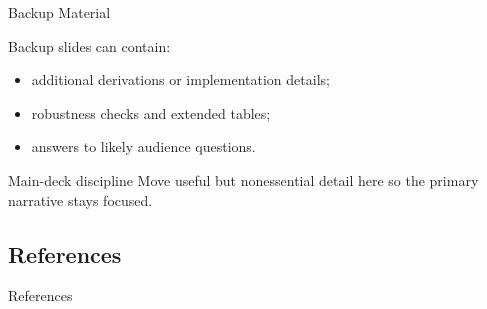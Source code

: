 \documentclass[10pt,aspectratio=169]{virgiling-slides}
\begin{document}
\begin{frame}{Backup Material}
  \hypertarget{backup-demo}{}

  Backup slides can contain:
  \begin{itemize}
    \item additional derivations or implementation details;
    \item robustness checks and extended tables;
    \item answers to likely audience questions.
  \end{itemize}

  \begin{block}{Main-deck discipline}
    Move useful but nonessential detail here so the primary narrative stays focused.
  \end{block}

  \begin{center}
    \hyperlink{navigation-demo}{}
  \end{center}
\end{frame}

\subsection{References}

\begin{frame}{References}
  \printbibliography[heading=none]
\end{frame}
\end{document}
